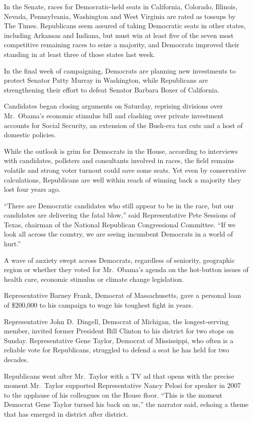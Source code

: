 ﻿\documentclass[12pt]{article}
\begin{document}
In the Senate, races for Democratic-held seats in California, Colorado, Illinois, Nevada,
Pennsylvania, Washington and West Virginia are rated as tossups by The Times. Republicans seem
assured of taking Democratic seats in other states, including Arkansas and Indiana, but must win at
least five of the seven most competitive remaining races to seize a majority, and Democrats improved
their standing in at least three of those states last week.

In the final week of campaigning, Democrats are planning new investments to protect Senator Patty
Murray in Washington, while Republicans are strengthening their effort to defeat Senator Barbara
Boxer of California.

Candidates began closing arguments on Saturday, reprising divisions over Mr.~Obama's economic
stimulus bill and clashing over private investment accounts for Social Security, an extension of the
Bush-era tax cuts and a host of domestic policies.

While the outlook is grim for Democrats in the House, according to interviews with candidates,
pollsters and consultants involved in races, the field remains volatile and strong voter turnout
could save some seats. Yet even by conservative calculations, Republicans are well within reach of
winning back a majority they lost four years ago.

``There are Democratic candidates who still appear to be in the race, but our candidates are
delivering the fatal blow,'' said Representative Pete Sessions of Texas, chairman of the National
Republican Congressional Committee. ``If we look all across the country, we are seeing incumbent
Democrats in a world of hurt.''

A wave of anxiety swept across Democrats, regardless of seniority, geographic region or whether they
voted for Mr.~Obama's agenda on the hot-button issues of health care, economic stimulus or climate
change legislation.

Representative Barney Frank, Democrat of Massachusetts, gave a personal loan of \$200,000 to his
campaign to wage his toughest fight in years.

Representative John D.~Dingell, Democrat of Michigan, the longest-serving member, invited former
President Bill Clinton to his district for two stops on Sunday. Representative Gene Taylor, Democrat
of Mississippi, who often is a reliable vote for Republicans, struggled to defend a seat he has held
for two decades.

Republicans went after Mr.~Taylor with a TV ad that opens with the precise moment Mr.~Taylor
supported Representative Nancy Pelosi for speaker in 2007 to the applause of his colleagues on the
House floor. ``This is the moment Democrat Gene Taylor turned his back on us,'' the narrator said,
echoing a theme that has emerged in district after district.
\end{document}
